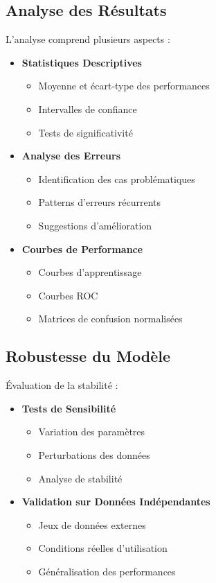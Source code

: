 \subsection{Analyse des Résultats}
L'analyse comprend plusieurs aspects :

\begin{itemize}
    \item \textbf{Statistiques Descriptives}
    \begin{itemize}
        \item Moyenne et écart-type des performances
        \item Intervalles de confiance
        \item Tests de significativité
    \end{itemize}

    \item \textbf{Analyse des Erreurs}
    \begin{itemize}
        \item Identification des cas problématiques
        \item Patterns d'erreurs récurrents
        \item Suggestions d'amélioration
    \end{itemize}

    \item \textbf{Courbes de Performance}
    \begin{itemize}
        \item Courbes d'apprentissage
        \item Courbes ROC
        \item Matrices de confusion normalisées
    \end{itemize}
\end{itemize}

\subsection{Robustesse du Modèle}
Évaluation de la stabilité :

\begin{itemize}
    \item \textbf{Tests de Sensibilité}
    \begin{itemize}
        \item Variation des paramètres
        \item Perturbations des données
        \item Analyse de stabilité
    \end{itemize}

    \item \textbf{Validation sur Données Indépendantes}
    \begin{itemize}
        \item Jeux de données externes
        \item Conditions réelles d'utilisation
        \item Généralisation des performances
    \end{itemize}
\end{itemize}